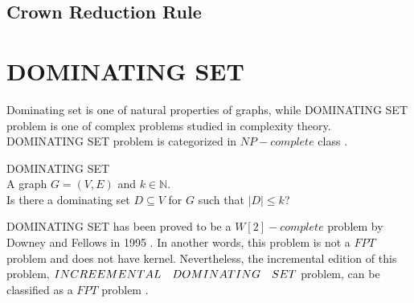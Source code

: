 \subsection{Crown Reduction Rule} \label{subsubsec:crown}
\section{\large{D}\normalsize{OMINATING} \Large{S}\normalsize{ET}} \label{subsec:comds}
Dominating set is one of natural properties of graphs, while \large{D}\normalsize{OMINATING} \Large{S}\normalsize{ET} problem is one of complex problems studied in complexity theory. \large{D}\normalsize{OMINATING} \Large{S}\normalsize{ET} problem is categorized in $NP-complete$ class \cite{garey1979}.
\begin{dproblem}
{\sc \large{D}\normalsize{OMINATING} \Large{S}\normalsize{ET}}\\
\instance A graph $G=(V,E)$ and $k \in \mathds{N}$.\\
\ques Is there a dominating set $D \subseteq V$ for $G$ such that $|D| \leqslant k$?\\
\cite{garey1979}
\end{dproblem}

\vskip -20pt
\large{D}\normalsize{OMINATING} \Large{S}\normalsize{ET} has been proved to be a $W[2]-complete$ problem by Downey and Fellows in 1995 \cite{downey1995}. In another words, this problem is not a $FPT$ problem and does not have kernel. Nevertheless, the incremental edition of this problem, $\large{I}\normalsize{NCREEMENTAL}\quad \large{D}\normalsize{OMINATING}\quad \Large{S}\normalsize{ET}$ problem, can be classified as a $FPT$ problem \cite{downey2014}.
\\
\\



